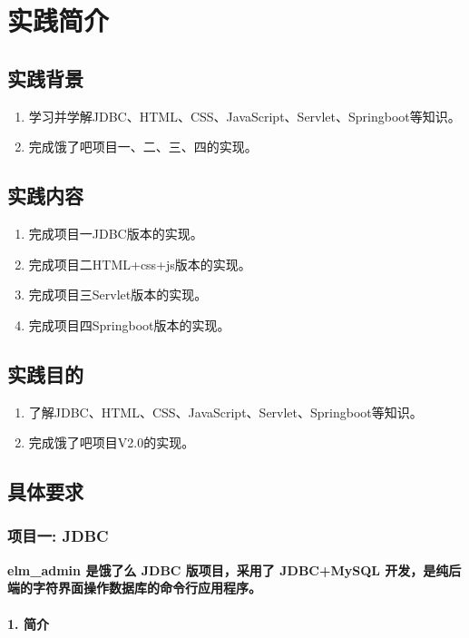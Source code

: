 
\chapter{实践简介}

\section{实践背景}
\begin{enumerate}
\item 学习并学解JDBC、HTML、CSS、JavaScript、Servlet、Springboot等知识。
\item 完成饿了吧项目一、二、三、四的实现。
\end{enumerate}

\section{实践内容}
\begin{enumerate}
\item 完成项目一JDBC版本的实现。
\item 完成项目二HTML+css+js版本的实现。
\item 完成项目三Servlet版本的实现。
\item 完成项目四Springboot版本的实现。
\end{enumerate}

\section{实践目的}
\begin{enumerate}
\item 了解JDBC、HTML、CSS、JavaScript、Servlet、Springboot等知识。
\item 完成饿了吧项目V2.0的实现。
\end{enumerate}


\section{具体要求}

\subsection*{项目一: JDBC}
\textbf{elm\_admin 是饿了么 JDBC 版项目，采用了 JDBC+MySQL 开发，是纯后端的字符界面操作数据库的命令行应用程序。}
\subsubsection*{1. 简介}

